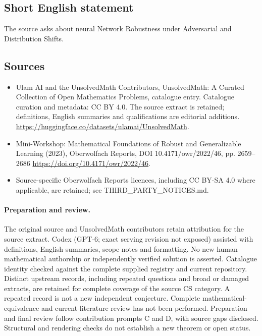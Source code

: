 \documentclass[11pt]{article}
\begin{document}
\subsection{Short English statement}
The source asks about neural Network Robustness under Adversarial and Distribution Shifts.
\subsection{Sources}
\begin{itemize}
\item[\hypertarget{source:statement:1}{S1}] Ulam AI and the UnsolvedMath Contributors, UnsolvedMath: A Curated Collection of Open Mathematics Problems, catalogue entry. Catalogue curation and metadata: CC BY 4.0. The source extract is retained; definitions, English summaries and qualifications are editorial additions.
\url{https://huggingface.co/datasets/ulamai/UnsolvedMath}.
\item[\hypertarget{source:statement:2}{S2}] Mini-Workshop: Mathematical Foundations of Robust and Generalizable Learning (2023), Oberwolfach Reports, DOI 10.4171/owr/2022/46, pp. 2659--2686
\url{https://doi.org/10.4171/owr/2022/46}.
\item Source-specific Oberwolfach Reports licences, including CC BY-SA 4.0 where applicable, are retained; see THIRD\_PARTY\_NOTICES.md.
\end{itemize}
\paragraph{Preparation and review.}
The original source and UnsolvedMath contributors retain attribution for the source extract. Codex (GPT-6; exact serving revision not exposed) assisted with definitions, English summaries, scope notes and formatting. No new human mathematical authorship or independently verified solution is asserted. Catalogue identity checked against the complete supplied registry and current repository. Distinct upstream records, including repeated questions and broad or damaged extracts, are retained for complete coverage of the source CS category. A repeated record is not a new independent conjecture. Complete mathematical-equivalence and current-literature review has not been performed. Preparation and final review follow contribution prompts C and D, with source gaps disclosed. Structural and rendering checks do not establish a new theorem or open status.
\label{end:statement}
\end{document}
